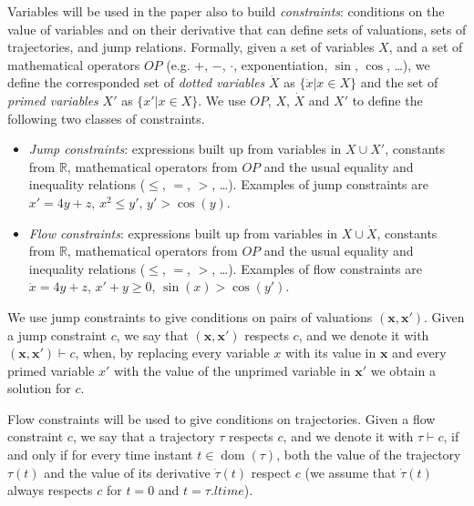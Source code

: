 \documentclass[submission,copyright,creativecommons]{eptcs}
\newcommand{\cmodels}{\vdash}
\newcommand{\op}{\ensuremath{OP}\xspace}
\DeclareMathOperator{\dom}{\mathrm{dom}}
\newcommand{\bbR}{\mathbb{R}}
\newcommand{\ltime}{\mathit{ltime}}
\newcommand{\bx}{\mathbf{x}}
\begin{document}
\medskip

Variables will be used in the paper also to build \emph{constraints}: conditions on the value of variables and on their derivative that can define sets of valuations, sets of trajectories, and jump relations. Formally, given a set of variables $X$, and a set of mathematical operators $\op$ (e.g. $+$, $-$, $\cdot$, exponentiation, $\sin$, $\cos$, \dots), we define the corresponded set of \emph{dotted variables} $\dot{X}$ as $\{\dot{x} | x \in X\}$ and the set of \emph{primed variables} $X'$ as $\{x' | x \in X\}$. We use $\op$, $X$, $\dot{X}$ and $X'$ to define the following two classes of constraints.

\begin{itemize}


	\item \emph{Jump constraints}: expressions built up from variables in $X \cup X'$, constants from $\bbR$, mathematical operators from $\op$ and the usual equality and inequality relations ($\leq$, $=$, $>$, \dots). Examples of jump constraints are $x' = 4 y + z$, $x^2 \leq y'$, $y' > \cos(y)$.

	\item \emph{Flow constraints}: expressions built up from variables in $X \cup \dot{X}$, constants from $\bbR$, mathematical operators from $\op$ and the usual equality and inequality relations ($\leq$, $=$, $>$, \dots). Examples of flow constraints are $\dot{x} = 4 y + z$, $x' + y \geq 0$, $\sin(x) > \cos(y')$.
\end{itemize}





We use jump constraints to give conditions on pairs of valuations $(\bx, \bx')$. Given a jump constraint $c$, we say that $(\bx, \bx')$ respects $c$, and we denote it with $(\bx, \bx') \cmodels c$, when, by replacing every variable $x$ with its value in $\bx$ and every primed variable $x'$ with the value of the unprimed variable in $\bx'$ we obtain a solution for $c$.

Flow constraints will be used to give conditions on trajectories. Given a flow constraint $c$, we say that a trajectory $\tau$ respects $c$, and we denote it with $\tau \cmodels c$, if and only if for every time instant $t \in \dom(\tau)$, both the value of the trajectory $\tau(t)$ and the value of its derivative $\dot{\tau}(t)$ respect $c$ (we assume that $\dot{\tau}(t)$ always respects $c$ for $t=0$ and $t=\tau.\ltime$).

\medskip
\end{document}
